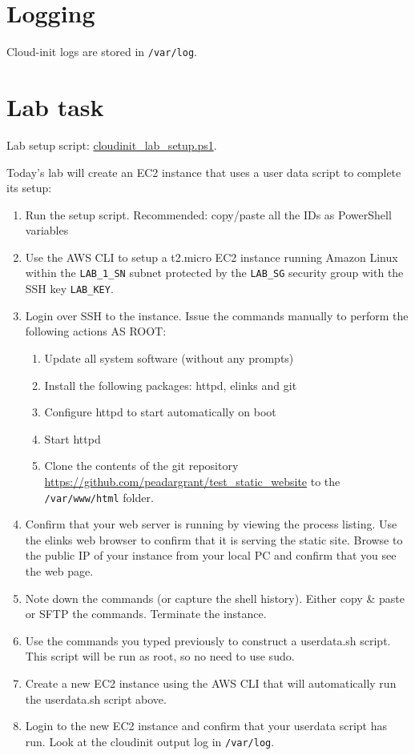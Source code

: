 \section{Logging}\label{logging}

Cloud-init logs are stored in \texttt{/var/log}.

\section{Lab task}\label{lab-task}

Lab setup script: \url{cloudinit_lab_setup.ps1}.

Today's lab will create an EC2 instance that uses a user data script to
complete its setup:

\begin{enumerate}
\def\labelenumi{\arabic{enumi}.}
\item
  Run the setup script. Recommended: copy/paste all the IDs as
  PowerShell variables
\item
  Use the AWS CLI to setup a t2.micro EC2 instance running Amazon Linux
  within the \texttt{LAB\_1\_SN} subnet protected by the
  \texttt{LAB\_SG} security group with the SSH key \texttt{LAB\_KEY}.
\item
  Login over SSH to the instance. Issue the commands manually to perform
  the following actions AS ROOT:

  \begin{enumerate}
  \def\labelenumii{\arabic{enumii}.}
  \item
    Update all system software (without any prompts)
  \item
    Install the following packages: httpd, elinks and git
  \item
    Configure httpd to start automatically on boot
  \item
    Start httpd
  \item
    Clone the contents of the git repository
    \url{https://github.com/peadargrant/test_static_website} to the
    \texttt{/var/www/html} folder.
  \end{enumerate}
\item
  Confirm that your web server is running by viewing the process
  listing. Use the elinks web browser to confirm that it is serving the
  static site. Browse to the public IP of your instance from your local
  PC and confirm that you see the web page.
\item
  Note down the commands (or capture the shell history). Either copy \&
  paste or SFTP the commands. Terminate the instance.
\item
  Use the commands you typed previously to construct a userdata.sh
  script. This script will be run as root, so no need to use sudo.
\item
  Create a new EC2 instance using the AWS CLI that will automatically
  run the userdata.sh script above.
\item
  Login to the new EC2 instance and confirm that your userdata script
  has run. Look at the cloudinit output log in \texttt{/var/log}.
\end{enumerate}
